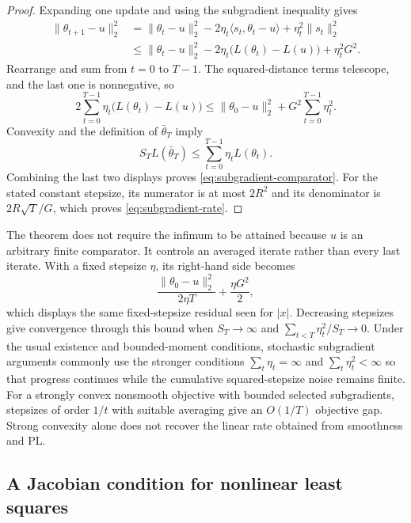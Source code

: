 \documentclass[11pt,twoside]{article}
\theoremstyle{definition}
\theoremstyle{remark}
\begin{document}
\begin{proof}
Expanding one update and using the subgradient inequality gives
\begin{align*}
 \|\theta_{t+1}-u\|_2^2
 &=\|\theta_t-u\|_2^2
   -2\eta_t\langle s_t,\theta_t-u\rangle
   +\eta_t^2\|s_t\|_2^2\\
 &\le \|\theta_t-u\|_2^2
   -2\eta_t\bigl(L(\theta_t)-L(u)\bigr)
   +\eta_t^2G^2.
\end{align*}
Rearrange and sum from $t=0$ to $T-1$. The squared-distance terms telescope,
and the last one is nonnegative, so
\[
 2\sum_{t=0}^{T-1}\eta_t
      \bigl(L(\theta_t)-L(u)\bigr)
 \le \|\theta_0-u\|_2^2
      +G^2\sum_{t=0}^{T-1}\eta_t^2.
\]
Convexity and the definition of $\bar\theta_T$ imply
\[
 S_TL(\bar\theta_T)
 \le\sum_{t=0}^{T-1}\eta_tL(\theta_t).
\]
Combining the last two displays proves
\cref{eq:subgradient-comparator}. For the stated constant stepsize, its
numerator is at most $2R^2$ and its denominator is
$2R\sqrt T/G$, which proves \cref{eq:subgradient-rate}.
\end{proof}

The theorem does not require the infimum to be attained because $u$ is an
arbitrary finite comparator. It controls an averaged iterate rather than
every last iterate. With a fixed stepsize $\eta$, its right-hand side becomes
\[
 \frac{\|\theta_0-u\|_2^2}{2\eta T}+\frac{\eta G^2}{2},
\]
which displays the same fixed-stepsize residual seen for $|x|$. Decreasing
stepsizes give convergence through this bound when $S_T\to\infty$ and
$\sum_{t<T}\eta_t^2/S_T\to0$. Under the usual existence and bounded-moment
conditions, stochastic subgradient arguments commonly use the stronger
conditions
$\sum_t\eta_t=\infty$ and $\sum_t\eta_t^2<\infty$ so that progress continues
while the cumulative squared-stepsize noise remains finite. For a strongly
convex nonsmooth objective with bounded selected subgradients, stepsizes of
order $1/t$ with suitable averaging give an $O(1/T)$ objective gap. Strong
convexity alone does not recover the linear rate obtained from smoothness and
PL.

\subsection{A Jacobian condition for nonlinear least squares}
\label{sec:nls-pl}
\end{document}
